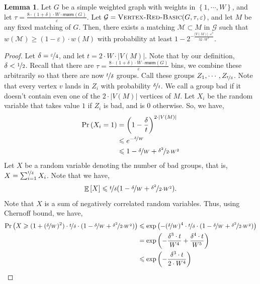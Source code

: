 \documentclass[a4paper,11pt]{article}
\DeclareMathOperator*{\Exp}{\ensuremath{{\mathbb{E}}}}
\DeclareMathOperator*{\Prob}{\ensuremath{\textnormal{Pr}}}
\renewcommand{\Pr}{\Prob}
\newcommand{\prob}[1]{\Pr\paren{#1}}
\newcommand{\card}[1]{|#1|}
\newcommand{\paren}[1]{\left ( #1 \right )}
\newcommand{\bracket}[1]{\left [ #1 \right ]}
\newcommand{\expect}[1]{\Exp\bracket{#1}}
\newcommand{\set}[1]{\ensuremath{\left\{ #1 \right\}}}
\newcommand{\eps}{\varepsilon}
\theoremstyle{definition}
\theoremstyle{definition}
\theoremstyle{definition}
\theoremstyle{definition}
\theoremstyle{definition}
\newtheorem{lemma2}[definition2]{Lemma}
\theoremstyle{definition}
\theoremstyle{definition}
\theoremstyle{definition}
\theoremstyle{definition}
\theoremstyle{definition}
\theoremstyle{definition}
\theoremstyle{definition}
\theoremstyle{definition}
\theoremstyle{definition}
\theoremstyle{definition}
\begin{document}
\begin{lemma2}\label{lem:analysisalg}
Let $G$ be a simple weighted graph with weights in $\set{1,\cdots, W}$, and let $\tau= \frac{8\cdot (1+\delta)\cdot W\cdot \textsf{mwm}(G)}{\eps}$. Let $\mathcal{G}=\textsc{Vertex-Red-Basic}(G,\tau,\eps)$, and let $M$ be any fixed matching of $G$. Then, there exists a matching $\mathcal{M}\subset M$ in $\mathcal{G}$ such that $w(\mathcal{M})\geqslant (1-\eps)\cdot w(M)$ with probability at least $1-2^{-\frac{\card{V(M)}\cdot \eps^3}{32\cdot W^3}}$.
\end{lemma2}
\begin{proof}
Let $\delta = \nicefrac{\varepsilon}{4}$, and let $t= 2\cdot W\cdot \card{V(M)}$. Note that by our definition, $\delta<\nicefrac{1}{2}$. Recall that there are $\tau= \frac{8\cdot (1+\delta)\cdot W\cdot \textsf{mwm}(G)}{\eps}$ bins, we combine these arbitrarily so that there are now $\nicefrac{t}{\delta}$ groups. Call these groups $Z_1,\cdots, Z_{\nicefrac{t}{\delta}}$.  Note that every vertex $v$ lands in $Z_i$ with probability $\nicefrac{\delta}{t}$. We call a group bad if it doesn't contain even one of the $2\cdot \card{V(M)}$ vertices of $M$. Let $X_i$ be the random variable that takes value $1$ if $Z_i$ is bad, and is $0$ otherwise. So, we have,
\begin{align*}
\prob{X_i=1}&=\paren{1-\frac{\delta}{t}}^{2\cdot \card{V(M)}}\\
&\leqslant e^{-\nicefrac{\delta}{W}}\\
&\leqslant 1-\nicefrac{\delta}{W} +\nicefrac{\delta^2}{2\cdot W^2}
\end{align*}
Let $X$ be a random variable denoting the number of bad groups, that is, $X=\sum_{i=1}^{\nicefrac{t}{\delta}} X_i$. Note that we have,
\begin{align*}
\expect{X}\leqslant\nicefrac{t}{\delta}(1-\nicefrac{\delta}{W} +\nicefrac{\delta^2}{2\cdot W^2}). 
\end{align*}
Note that $X$ is a sum of negatively correlated random variables. Thus, using Chernoff bound, we have,
\begin{align*}
\prob{X\geqslant (1+(\nicefrac{\delta}{W})^2)\cdot \nicefrac{t}{\delta}\cdot (1-\nicefrac{\delta}{W} +\nicefrac{\delta^2}{2\cdot W^2})}&\leqslant \exp\paren{-(\nicefrac{\delta}{W})^4\cdot \nicefrac{t}{\delta}\cdot (1-\nicefrac{\delta}{W} +\nicefrac{\delta^2}{2\cdot W^2}) }\\
&=\exp\paren{-\frac{\delta^3\cdot t}{W^4}+\frac{\delta^4\cdot t}{W^5}}\\
&\leqslant \exp\paren{-\frac{\delta^3\cdot t}{2\cdot W^4}}

\end{align*}
\end{proof}
\end{document}
